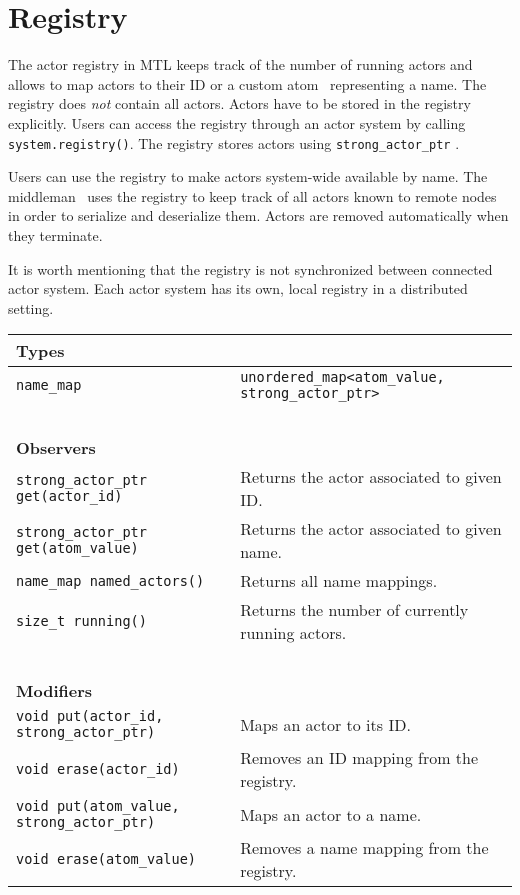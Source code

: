\section{Registry}
\label{registry}

The actor registry in MTL keeps track of the number of running actors and
allows to map actors to their ID or a custom atom~ representing a
name. The registry does \emph{not} contain all actors. Actors have to be stored
in the registry explicitly. Users can access the registry through an actor
system by calling \lstinline^system.registry()^. The registry stores actors
using \lstinline^strong_actor_ptr^ .

Users can use the registry to make actors system-wide available by name. The
middleman~ uses the registry to keep track of all actors known
to remote nodes in order to serialize and deserialize them. Actors are removed
automatically when they terminate.

It is worth mentioning that the registry is not synchronized between connected
actor system. Each actor system has its own, local registry in a distributed
setting.

\begin{center}
\begin{tabular}{ll}
  \textbf{Types} & ~ \\
  \hline
  \lstinline^name_map^ & \lstinline^unordered_map<atom_value, strong_actor_ptr>^ \\
  \hline
  ~ & ~ \\ \textbf{Observers} & ~ \\
  \hline
  \lstinline^strong_actor_ptr get(actor_id)^ & Returns the actor associated to given ID. \\
  \hline
  \lstinline^strong_actor_ptr get(atom_value)^ & Returns the actor associated to given name. \\
  \hline
  \lstinline^name_map named_actors()^ & Returns all name mappings. \\
  \hline
  \lstinline^size_t running()^ & Returns the number of currently running actors. \\
  \hline
  ~ & ~ \\ \textbf{Modifiers} & ~ \\
  \hline
  \lstinline^void put(actor_id, strong_actor_ptr)^ & Maps an actor to its ID. \\
  \hline
  \lstinline^void erase(actor_id)^ & Removes an ID mapping from the registry. \\
  \hline
  \lstinline^void put(atom_value, strong_actor_ptr)^ & Maps an actor to a name. \\
  \hline
  \lstinline^void erase(atom_value)^ & Removes a name mapping from the registry. \\
  \hline
\end{tabular}
\end{center}

